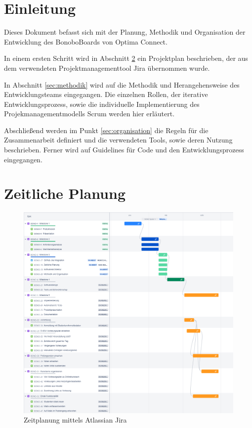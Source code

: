 \documentclass[a4paper,11pt]{scrartcl}
\begin{document}
\section{Einleitung}\label{sec:einleitung}
Dieses Dokument befasst sich mit der Planung, Methodik und Organisation der Entwicklung des BonoboBoards von Optima Connect.

In einem ersten Schritt wird in Abschnitt \ref{sec:zeitliche-planung} ein Projektplan beschrieben, der aus dem verwendeten Projektmanagementtool Jira übernommen wurde.

In Abschnitt \ref{sec:methodik} wird auf die Methodik und Herangehensweise des Entwicklungsteams eingegangen. Die einzelnen Rollen, der iterative Entwicklungsprozess, sowie die individuelle Implementierung des Projekmanagementmodells Scrum werden hier erläutert.

Abschließend werden im Punkt \ref{sec:organisation} die Regeln für die Zusammenarbeit definiert und die verwendeten Tools, sowie deren Nutzung beschrieben. Ferner wird auf Guidelines für Code und den Entwicklungsprozess eingegangen.

\section{Zeitliche Planung}\label{sec:zeitliche-planung}

  \begin{figure}[H]
\includegraphics[width=\textwidth]{timeplan}
\caption{Zeitplanung mittels Atlassian Jira}
\label{img:Zeitplanung}
\end{figure}
\end{document}
